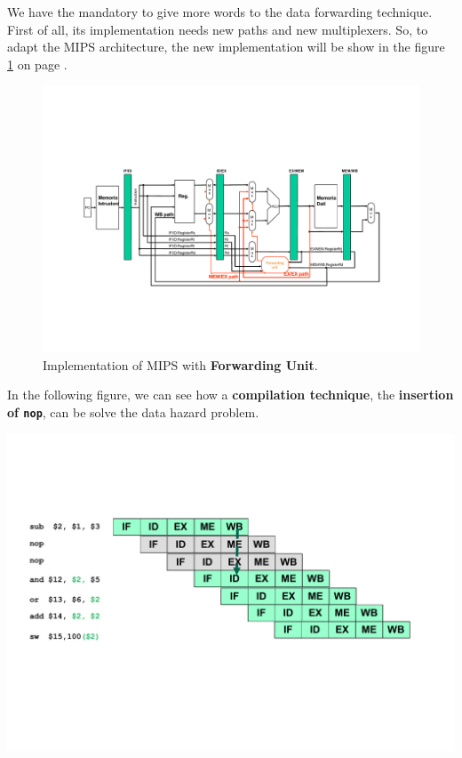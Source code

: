 \documentclass[a4paper]{article}
\newcommand{\definition}[1]{\textcolor{Red3}{\textbf{#1}}\index{#1}}
\begin{document}
    We have the mandatory to give more words to the data forwarding technique. First of all, its implementation needs new paths and new multiplexers. So, to adapt the MIPS architecture, the new implementation will be show in the figure \ref{fig: implementation of MIPS with Forwarding Unit} on page \pageref{fig: implementation of MIPS with Forwarding Unit}.
    \begin{figure}[!htp]
        \centering
        \includegraphics[width=\textwidth]{img/implementation-mips-forwarding-unit-1.pdf}
        \caption{Implementation of MIPS with \definition{Forwarding Unit}.\cite{pipelining-slides}}
        \label{fig: implementation of MIPS with Forwarding Unit}
    \end{figure}

    \begin{examplebox}\label{example: insertion of nop}
        In the following figure, we can see how a \textbf{compilation technique}, the \textbf{insertion of \texttt{nop}}, can be solve the data hazard problem.
        \begin{center}
            \includegraphics[width=\textwidth]{img/insertion-of-nop-1.pdf}
        \end{center}
    \end{examplebox}
\end{document}

